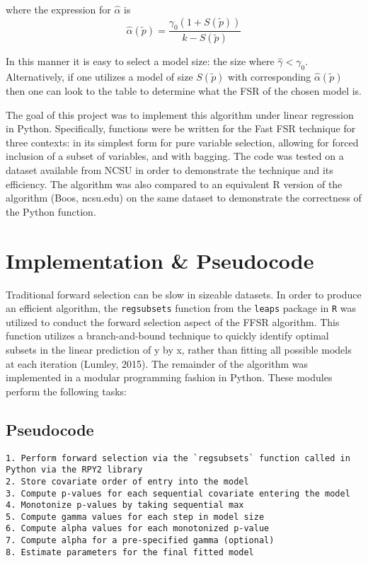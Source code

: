 \documentclass{article}
\begin{document}
where the expression for $\hat{\alpha}$ is
\[ \hat{\alpha}(\tilde{p}) = \frac{\gamma_0(1+S(\tilde{p}))}{k - S(\tilde{p})}\]

In this manner it is easy to select a model size: the size where
$\hat{\gamma} < \gamma_0$. Alternatively, if one utilizes a model of
size $S(\tilde{p})$ with corresponding $\hat{\alpha}(\tilde{p})$ then
one can look to the table to determine what the FSR of the chosen model
is.

The goal of this project was to implement this algorithm under linear
regression in Python. Specifically, functions were be written for the
Fast FSR technique for three contexts: in its simplest form for pure
variable selection, allowing for forced inclusion of a subset of
variables, and with bagging. The code was tested on a dataset available
from NCSU in order to demonstrate the technique and its efficiency. The
algorithm was also compared to an equivalent R version of the algorithm
(Boos, ncsu.edu) on the same dataset to demonstrate the correctness of
the Python function.

    \section{Implementation \& Pseudocode}\label{implementation-pseudocode}

Traditional forward selection can be slow in sizeable datasets. In order
to produce an efficient algorithm, the \texttt{regsubsets} function from
the \texttt{leaps} package in \texttt{R} was utilized to conduct the
forward selection aspect of the FFSR algorithm. This function utilizes a
branch-and-bound technique to quickly identify optimal subsets in the
linear prediction of y by x, rather than fitting all possible models at
each iteration (Lumley, 2015). The remainder of the algorithm was
implemented in a modular programming fashion in Python. These modules
perform the following tasks:

    \subsection{Pseudocode}\label{pseudocode}

\begin{verbatim}
1. Perform forward selection via the `regsubsets` function called in Python via the RPY2 library
2. Store covariate order of entry into the model
3. Compute p-values for each sequential covariate entering the model
4. Monotonize p-values by taking sequential max
5. Compute gamma values for each step in model size
6. Compute alpha values for each monotonized p-value
7. Compute alpha for a pre-specified gamma (optional)
8. Estimate parameters for the final fitted model
\end{verbatim}
\end{document}
